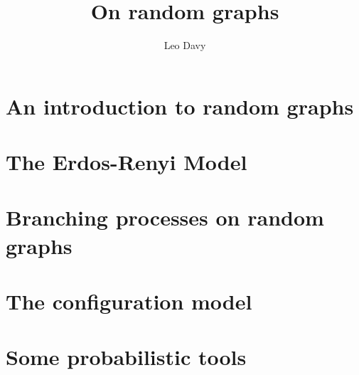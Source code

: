 \documentclass{report}
\title{On random graphs}
\author{Leo Davy }
\date{}
\theoremstyle{definition}
\begin{document}
\maketitle
\tableofcontents{}

\chapter{An introduction to random graphs}


\chapter{The Erdos-Renyi Model}


\chapter{Branching processes on random graphs}


\chapter{The configuration model}


\appendix

\chapter{Some probabilistic tools}


\printbibliography[heading = bibintoc, title={References}]
\end{document}
